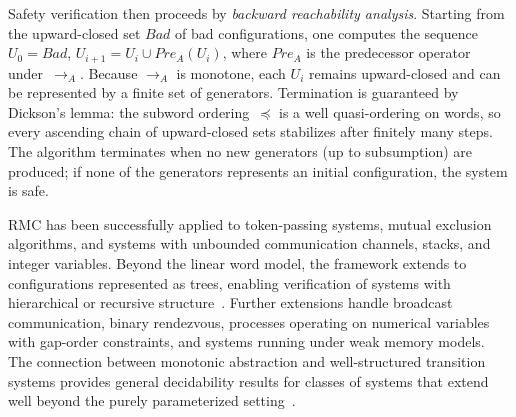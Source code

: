 Safety verification then proceeds by \emph{backward reachability analysis}.
Starting from the upward-closed set $\mathit{Bad}$ of bad configurations, one
computes the sequence $U_0 = \mathit{Bad}$, $U_{i+1} = U_i \cup
\mathit{Pre}_A(U_i)$, where $\mathit{Pre}_A$ is the predecessor operator
under~$\to_A$. Because $\to_A$ is monotone, each $U_i$ remains upward-closed
and can be represented by a finite set of generators. Termination is
guaranteed by Dickson's lemma: the subword ordering~$\preceq$ is a well
quasi-ordering on words, so every ascending chain of upward-closed sets
stabilizes after finitely many steps. The algorithm terminates when no new
generators (up to subsumption) are produced; if none of the generators
represents an initial configuration, the system is safe.

RMC has been successfully applied to token-passing systems, mutual exclusion
algorithms, and systems with unbounded communication channels, stacks, and
integer variables. Beyond the linear word model, the framework extends to
configurations represented as trees, enabling verification of systems with
hierarchical or recursive structure~\cite{AJNO02}. Further extensions handle
broadcast communication, binary rendezvous, processes operating on numerical
variables with gap-order constraints, and systems running under weak memory
models. The connection between monotonic abstraction and well-structured
transition systems provides general decidability results for classes of
systems that extend well beyond the purely parameterized setting~\cite{Abd10}.
